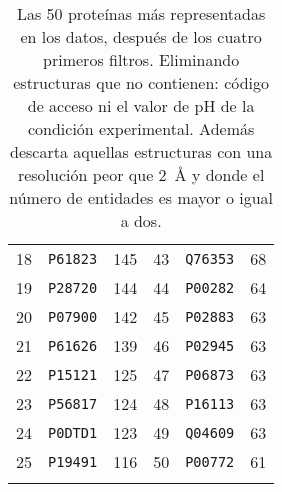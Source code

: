 \begin{table}[h]
\begin{tabular}{@{}llllll@{}}
18     & \texttt{P61823} & 145    & 43     & \texttt{Q76353}     & 68   \\
19     & \texttt{P28720} & 144    & 44     & \texttt{P00282}     & 64   \\
20     & \texttt{P07900} & 142    & 45     & \texttt{P02883}     & 63   \\
21     & \texttt{P61626} & 139    & 46     & \texttt{P02945}     & 63   \\
22     & \texttt{P15121} & 125    & 47     & \texttt{P06873}     & 63   \\
23     & \texttt{P56817} & 124    & 48     & \texttt{P16113}     & 63   \\
24     & \texttt{P0DTD1} & 123    & 49     & \texttt{Q04609}     & 63   \\
25     & \texttt{P19491} & 116    & 50     & \texttt{P00772}     & 61   \\ \bottomrule
	\caption[Las 50 proteínas más representadas]{Las 50 proteínas más representadas en los datos, después de los cuatro primeros filtros. Eliminando estructuras que no contienen: código de acceso ni el valor de pH de la condición experimental. Además descarta aquellas estructuras con una resolución peor que \SI{2}{\angstrom} y donde el número de entidades es mayor o igual a dos.}
	\labtab{tab:top50}
	\end{tabular}
\end{table}

